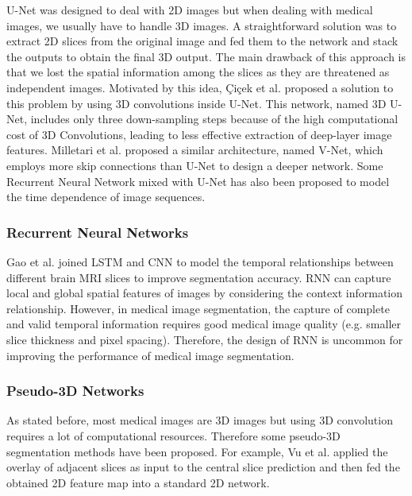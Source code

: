 U-Net was designed to deal with 2D images but when dealing with medical images,
we usually have to handle 3D images. A straightforward solution was to extract
2D slices from the original image and fed them to the network and stack the
outputs to obtain the final 3D output.
The main drawback of this approach is that we lost the spatial information among
the slices as they are threatened as independent images. Motivated by this idea,
Çiçek et al. \cite{cicek20163dunet} proposed a solution to this problem by using
3D convolutions inside U-Net. This network, named 3D U-Net, includes only three
down-sampling steps because of the high computational cost of 3D Convolutions,
leading to less effective extraction of deep-layer image features.
Milletari et al. \cite{milletari2016vnet} proposed a similar architecture, named
V-Net, which employs more skip connections than U-Net to design a deeper
network. Some Recurrent Neural Network mixed with U-Net has also been proposed
to model the time dependence of image sequences.

\subsubsection{Recurrent Neural Networks}
Gao et al. \cite{gao2018lstm} joined LSTM and CNN to model the temporal
relationships between different brain MRI slices to improve segmentation
accuracy. RNN can capture local and global spatial features of images by
considering the context information relationship. However, in medical image
segmentation, the capture of complete and valid temporal information requires
good medical image quality (e.g. smaller slice thickness and pixel spacing).
Therefore, the design of RNN is uncommon for improving the performance of
medical image segmentation.

\subsubsection{Pseudo-3D Networks}
As stated before, most medical images are 3D images but using 3D convolution
requires a lot of computational resources. Therefore some pseudo-3D segmentation
methods have been proposed. For example, Vu et al. \cite{vu2020pseudo3d} applied
the overlay of adjacent slices as input to the central slice prediction and then
fed the obtained 2D feature map into a standard 2D network.

